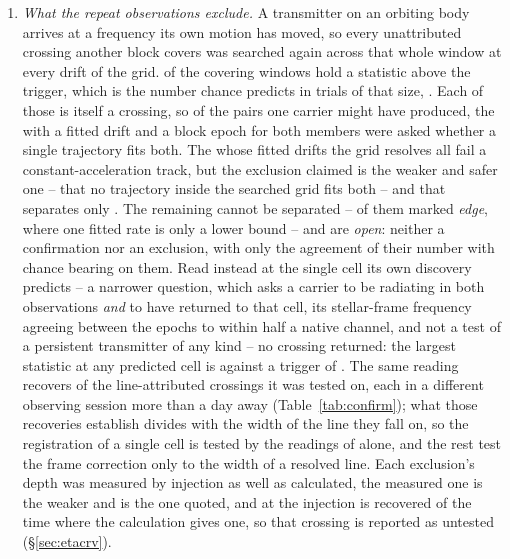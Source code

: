 \begin{enumerate}[leftmargin=1.6em,itemsep=4pt,topsep=4pt,parsep=0pt]
\item \emph{What the repeat observations exclude.} A transmitter on an
orbiting body arrives at a frequency its own motion has moved, so every
unattributed crossing another block covers was searched again across that
whole window at every drift of the grid. \WdNExc{} of the \WdNCov{} covering
windows hold a statistic above the trigger, which is the number chance
predicts in trials of that size, \WdExpect. Each of those is itself a
crossing, so of the \TjNCandPair{} pairs one carrier might have produced, the
\TjNPair{} with a fitted drift and a block epoch for both members were asked
whether a single trajectory fits both. The \TjNPower{} whose
fitted drifts the grid resolves all fail a constant-acceleration track, but
the exclusion claimed is the weaker and safer one -- that no trajectory
inside the searched grid fits both -- and that separates only \TjNExcl.
The remaining \TjNOpen{} cannot be separated -- \TjNPairEdge{} of them
marked \emph{edge}, where one fitted rate is only a lower bound -- and are
\emph{open}: neither a confirmation nor an exclusion, with only the
agreement of their number with chance bearing on them. Read instead at the single cell
its own discovery predicts -- a narrower question, which asks a carrier to be
radiating in both observations \emph{and} to have returned to that cell, its
stellar-frame frequency agreeing between the epochs to within half a native
channel, and not a test of a
persistent transmitter of any kind -- no crossing returned: the largest
statistic at any predicted cell is \RcTMax{} against a trigger of
\StageNullTrig. The same reading recovers \MkAttrRecur{} of the
\MkAttrTested{} line-attributed crossings it was tested on, each in a
different observing session more than a day away
(Table~\ref{tab:confirm}); what those recoveries establish divides with the
width of the line they fall on, so the registration of a single cell is
tested by the \RgRegNUnres{} readings of \RgRegStar{} alone, and the rest
test the frame correction only to the width of a resolved line. Each
exclusion's depth was measured by injection as well as calculated, the
measured one is the weaker and is the one quoted, and at \HjEtaStar{} the
injection is recovered \HjEtaMeas{} of the time where the calculation gives
one, so that crossing is reported as untested
(\S\ref{sec:etacrv}).


\end{enumerate}
